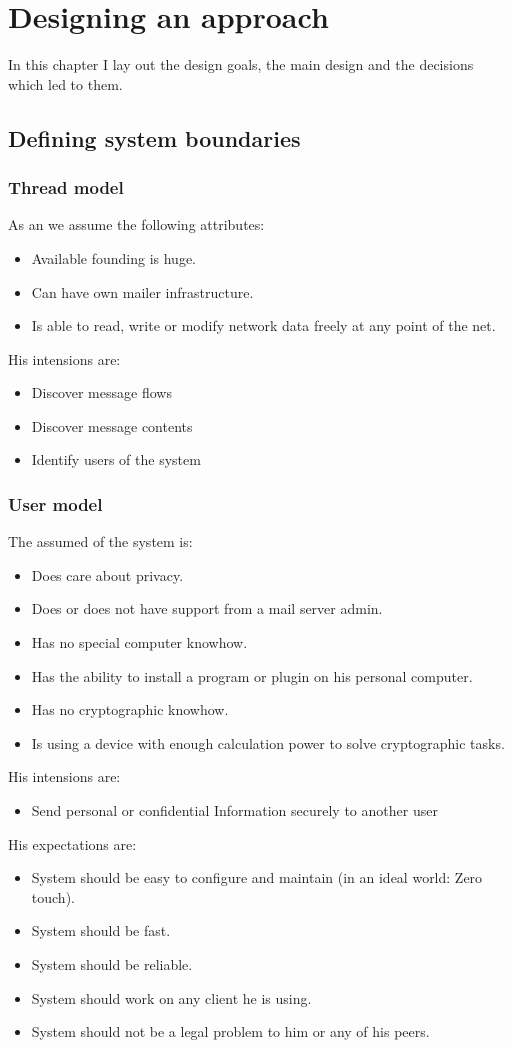\chapter{Designing an approach}
In this chapter I lay out the design goals, the main design and the decisions which led to them.


\section{Defining system boundaries}
\subsection{Thread model}
As an  we assume the following attributes:
\begin{itemize}
\item Available founding is huge.
\item Can have own mailer infrastructure.
\item Is able to read, write or modify network data freely at any point of the net.
\end{itemize}
His intensions are:
\begin{itemize}
\item Discover message flows
\item Discover message contents
\item Identify users of the system
\end{itemize}

\subsection{User model}
The assumed  of the system is:
\begin{itemize}
\item Does care about privacy.
\item Does or does not have support from a mail server admin.
\item Has no special computer knowhow.
\item Has the ability to install a program or plugin on his personal computer.
\item Has no cryptographic knowhow.
\item Is using a device with enough calculation power to solve cryptographic tasks.
\end{itemize}

His intensions are:
\begin{itemize}
\item Send personal or confidential Information securely to another user
\end{itemize}
His expectations are:
\begin{itemize}
\item System should be easy to configure and maintain (in an ideal world: Zero touch). 
\item System should be fast.
\item System should be reliable.
\item System should work on any client he is using.
\item System should not be a legal problem to him or any of his peers.
\end{itemize}

